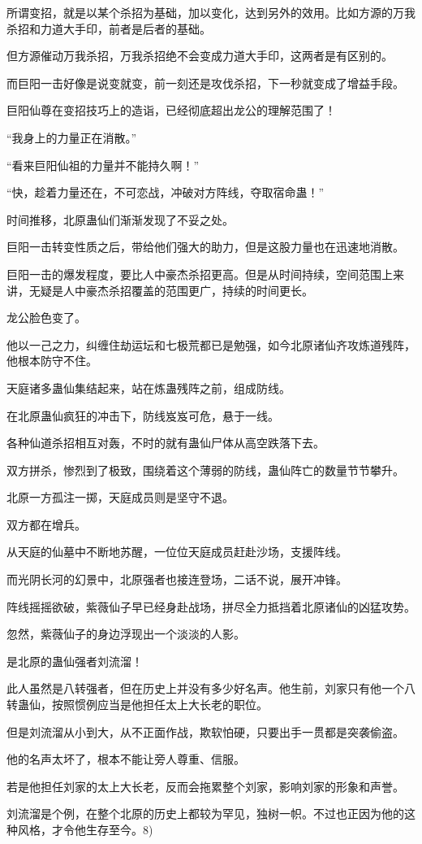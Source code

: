 \begin{this_body}
所谓变招，就是以某个杀招为基础，加以变化，达到另外的效用。比如方源的万我杀招和力道大手印，前者是后者的基础。

但方源催动万我杀招，万我杀招绝不会变成力道大手印，这两者是有区别的。

而巨阳一击好像是说变就变，前一刻还是攻伐杀招，下一秒就变成了增益手段。

巨阳仙尊在变招技巧上的造诣，已经彻底超出龙公的理解范围了！

“我身上的力量正在消散。”

“看来巨阳仙祖的力量并不能持久啊！”

“快，趁着力量还在，不可恋战，冲破对方阵线，夺取宿命蛊！”

时间推移，北原蛊仙们渐渐发现了不妥之处。

巨阳一击转变性质之后，带给他们强大的助力，但是这股力量也在迅速地消散。

巨阳一击的爆发程度，要比人中豪杰杀招更高。但是从时间持续，空间范围上来讲，无疑是人中豪杰杀招覆盖的范围更广，持续的时间更长。

龙公脸色变了。

他以一己之力，纠缠住劫运坛和七极荒都已是勉强，如今北原诸仙齐攻炼道残阵，他根本防守不住。

天庭诸多蛊仙集结起来，站在炼蛊残阵之前，组成防线。

在北原蛊仙疯狂的冲击下，防线岌岌可危，悬于一线。

各种仙道杀招相互对轰，不时的就有蛊仙尸体从高空跌落下去。

双方拼杀，惨烈到了极致，围绕着这个薄弱的防线，蛊仙阵亡的数量节节攀升。

北原一方孤注一掷，天庭成员则是坚守不退。

双方都在增兵。

从天庭的仙墓中不断地苏醒，一位位天庭成员赶赴沙场，支援阵线。

而光阴长河的幻景中，北原强者也接连登场，二话不说，展开冲锋。

阵线摇摇欲破，紫薇仙子早已经身赴战场，拼尽全力抵挡着北原诸仙的凶猛攻势。

忽然，紫薇仙子的身边浮现出一个淡淡的人影。

是北原的蛊仙强者刘流溜！

此人虽然是八转强者，但在历史上并没有多少好名声。他生前，刘家只有他一个八转蛊仙，按照惯例应当是他担任太上大长老的职位。

但是刘流溜从小到大，从不正面作战，欺软怕硬，只要出手一贯都是突袭偷盗。

他的名声太坏了，根本不能让旁人尊重、信服。

若是他担任刘家的太上大长老，反而会拖累整个刘家，影响刘家的形象和声誉。

刘流溜是个例，在整个北原的历史上都较为罕见，独树一帜。不过也正因为他的这种风格，才令他生存至今。8)

\end{this_body}

